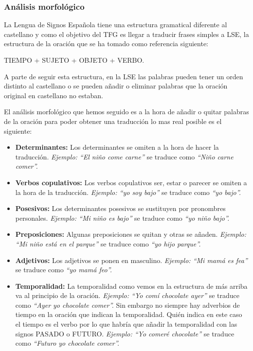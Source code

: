 \subsubsection{Análisis morfológico} 

La Lengua de Signos Española tiene una estructura gramatical diferente al castellano y como el objetivo del TFG es llegar a traducir frases simples a LSE, la estructura de la oración que se ha tomado como referencia siguiente:
\begin{center}
	TIEMPO + SUJETO + OBJETO + VERBO.
\end{center}

A parte de seguir esta estructura, en la LSE las palabras pueden tener un orden distinto al castellano o se pueden añadir o eliminar palabras que la oración original en castellano no estaban.

El análisis morfológico que hemos seguido es a la hora de añadir o quitar palabras de la oración para poder obtener una traducción lo mas real posible es el siguiente:

\begin{itemize}
	
	\item \textbf{Determinantes:} Los determinantes se omiten a la hora de hacer la traducción. \textit{Ejemplo: ``El niño come carne''} se traduce como \textit{``Niño carne comer''.}
	\item \textbf{Verbos copulativos:} Los verbos copulativos ser, estar o parecer se omiten a la hora de la traducción. \textit{Ejemplo: ``yo soy bajo''} se traduce como \textit{``yo bajo''.}
	
	\item \textbf{Posesivos:} Los determinantes posesivos se sustituyen por pronombres personales.  \textit{Ejemplo: ``Mi niño es bajo''} se traduce como \textit{``yo niño bajo''.}
	
	\item \textbf{Preposiciones:} Algunas preposiciones se quitan y otras se añaden.  \textit{Ejemplo: ``Mi niño está en el parque''} se traduce como \textit{``yo hijo parque''.}
	
	\item \textbf{Adjetivos:} Los adjetivos se ponen en masculino.  \textit{Ejemplo: ``Mi mamá es fea''} se traduce como \textit{``yo mamá feo''.}
	
	\item \textbf{Temporalidad:} La temporalidad como vemos en la estructura de más arriba va al principio de la oración. \textit{Ejemplo: ``Yo comí chocolate ayer''} se traduce como \textit{``Ayer yo chocolate comer''.} Sin embargo no siempre hay adverbios de tiempo en la oración que indican la temporalidad. Quién indica en este caso el tiempo es el verbo por lo que habría que añadir la temporalidad con las signos PASADO o FUTURO.
	\textit{Ejemplo: ``Yo comeré chocolate''} se traduce como \textit{``Futuro yo chocolate comer''.}
		
\end{itemize}


